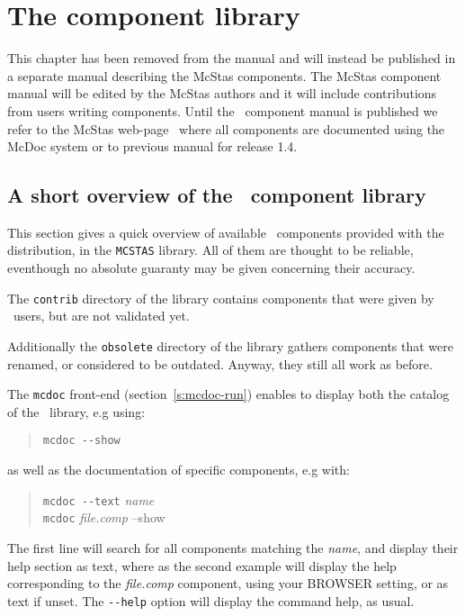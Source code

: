 
\chapter{The component library}
\label{s:components}

This chapter has been removed from the manual and will instead be published 
in a separate manual describing the McStas components. The McStas component manual will be edited by the McStas authors and it will include contributions from users writing components. Until the \MCS\ component manual is published we refer to the McStas web-page~\cite{mcstas_webpage} where all components are documented using the McDoc system or to previous manual for 
release 1.4.

\section{A short overview of the \MCS\ component library}
\label{s:comp-overview}

This section gives a quick overview of available \MCS\ components provided with the distribution, in the \verb+MCSTAS+ library. All of them are thought to be reliable, eventhough no absolute guaranty may be given concerning their accuracy.

The \verb+contrib+ directory of the library contains components that were given by \MCS\ users, but are not validated yet. 

Additionally the \verb+obsolete+ directory of the library gathers components that were renamed, or considered to be outdated. Anyway, they still all work as before.

The \verb+mcdoc+ front-end (section~\ref{s:mcdoc-run}) enables to display both the 
catalog of the \MCS\ library, e.g using: 
\begin{quote}
  \verb|mcdoc --show|
\end{quote}
as well as the documentation of specific components, e.g with:
\begin{quote}
  \verb|mcdoc --text| {\it name} \\
  \verb|mcdoc| {\it file.comp} --show
\end{quote}
The first line will search for all components matching the {\it name}, and display their help section as text, where as the second example will display the help corresponding to the {\it file.comp} component, using your BROWSER setting, or as text if unset. The \verb+--help+ option will display the command help, as usual.

